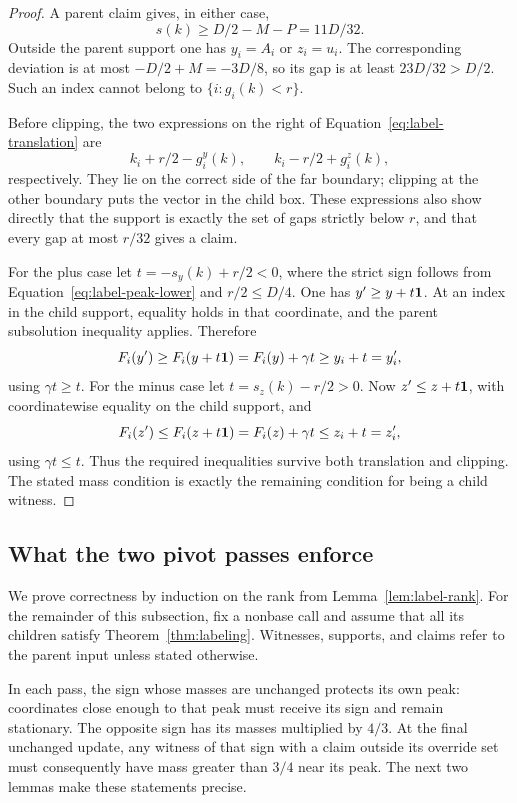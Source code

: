 \begin{proof}
A parent claim gives, in either case,
\begin{equation}
 s(k)\ge D/2-M-P=11D/32.
 \label{eq:label-peak-lower}
\end{equation}
Outside the parent support one has $y_i=A_i$ or $z_i=u_i$.
The corresponding deviation is at most $-D/2+M=-3D/8$,
so its gap is at least $23D/32>D/2$.  Such an index cannot
belong to $\{i:g_i(k)<r\}$.

Before clipping, the two expressions on the right of
Equation~\eqref{eq:label-translation} are
\[
 k_i+r/2-g_i^y(k),\qquad
 k_i-r/2+g_i^z(k),
\]
respectively.  They lie on the correct side of the far boundary;
clipping at the other boundary puts the vector in the child box.
These expressions also show directly that the support is exactly
the set of gaps strictly below $r$, and that every gap at most
$r/32$ gives a claim.

For the plus case let $t=-s_y(k)+r/2<0$, where the strict sign
follows from Equation~\eqref{eq:label-peak-lower} and $r/2\le D/4$.
One has $y'\ge y+t\mathbf 1$.  At an index in the child support,
equality holds in that coordinate, and the parent subsolution
inequality applies.  Therefore
\[
 F_i(y')\ge F_i(y+t\mathbf 1)=F_i(y)+\gamma t
          \ge y_i+t=y'_i,
\]
using $\gamma t\ge t$.  For the minus case let
$t=s_z(k)-r/2>0$.  Now $z'\le z+t\mathbf 1$, with coordinatewise
equality on the child support, and
\[
 F_i(z')\le F_i(z+t\mathbf 1)=F_i(z)+\gamma t
          \le z_i+t=z'_i,
\]
using $\gamma t\le t$.  Thus the required inequalities survive
both translation and clipping.  The stated mass condition is
exactly the remaining condition for being a child witness.
\end{proof}

\subsection{What the two pivot passes enforce}

We prove correctness by induction on the rank from
Lemma~\ref{lem:label-rank}.  For the remainder of this subsection,
fix a nonbase call and assume that all its children satisfy
Theorem~\ref{thm:labeling}.  Witnesses, supports, and claims refer
to the parent input unless stated otherwise.

In each pass, the sign whose masses are unchanged protects its own
peak: coordinates close enough to that peak must receive its sign
and remain stationary.  The opposite sign has its masses multiplied
by $4/3$.  At the final unchanged update, any witness of that sign
with a claim outside its override set must consequently have mass greater than
$3/4$ near its peak.  The next two lemmas make these statements
precise.

